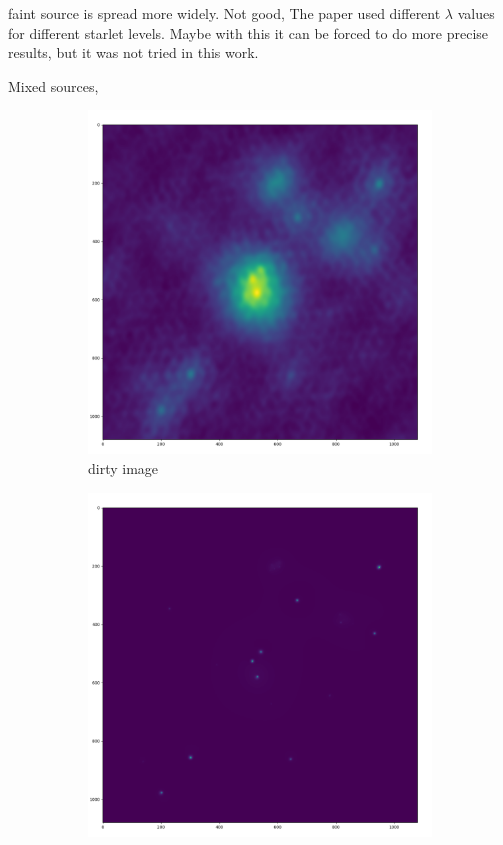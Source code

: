 faint source is spread more widely. Not good, The paper \cite{starck2015starlet} used different $\lambda$ values for different starlet levels. Maybe with this it can be forced to do more precise results, but it was not tried in this work.


Mixed sources, 

\begin{figure}[h]
	\centering
	\begin{subfigure}[b]{0.45\linewidth}
		\includegraphics[width=\linewidth]{./chapters/05.algorithms/results/sim00_mixed_sources_dirty.png}
		\caption{dirty image}
		\label{results:g55:nrao:rec}
	\end{subfigure}
	\begin{subfigure}[b]{0.45\linewidth}
		\includegraphics[width=\linewidth]{./chapters/05.algorithms/results/image4.png}

\end{subfigure}
\end{figure}
